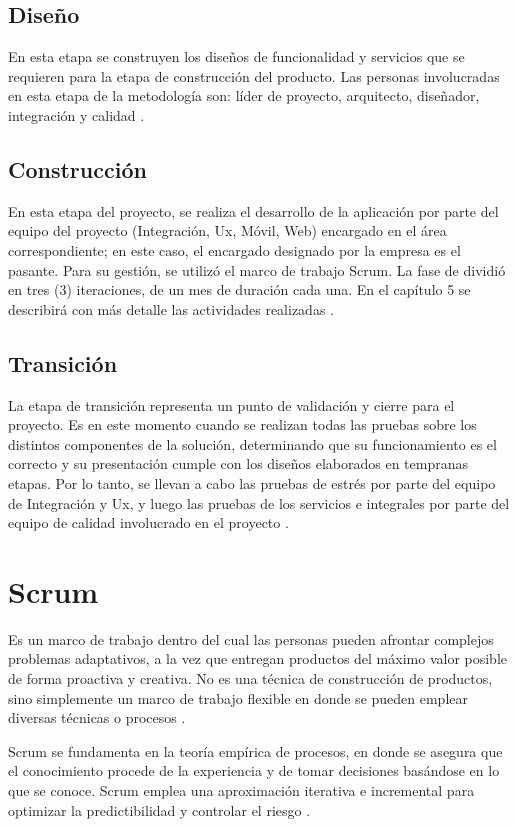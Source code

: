 \subsection{Diseño}
En esta etapa se construyen los diseños de funcionalidad y servicios que se requieren para la etapa de construcción del producto. Las personas involucradas en esta etapa de la metodología son: líder de proyecto, arquitecto, diseñador, integración y calidad \cite{MMSynergy}.

\subsection{Construcción}
En esta etapa del proyecto, se realiza el desarrollo de la aplicación por parte del equipo del proyecto (Integración, Ux, Móvil, Web) encargado en el área correspondiente; en este caso, el encargado designado por la empresa es el pasante. Para su gestión, se utilizó el marco de trabajo Scrum. La fase de dividió en tres (3) iteraciones, de un mes de duración cada una. En el capítulo 5 se describirá con más detalle las actividades realizadas \cite{MMSynergy}.

\subsection{Transición}
La etapa de transición representa un punto de validación y cierre para el proyecto. Es en este momento cuando se realizan todas las pruebas sobre los distintos componentes de la solución, determinando que su funcionamiento es el correcto y su presentación cumple con los diseños elaborados en tempranas etapas. Por lo tanto,  se llevan a cabo las pruebas de estrés por parte del equipo de Integración y Ux, y luego las pruebas de los servicios e integrales por parte del equipo de calidad involucrado en el proyecto \cite{MMSynergy}.

\section{Scrum} \label{sect:Scrum}
Es un marco de trabajo dentro del cual las personas pueden  afrontar complejos problemas adaptativos, a la vez que entregan productos del máximo valor posible de forma proactiva y creativa. No es una técnica de construcción de productos, sino simplemente un marco de trabajo flexible en donde se pueden emplear diversas técnicas o procesos \cite{MMSCRM}. 

Scrum se fundamenta en la teoría empírica de procesos, en donde se asegura que el conocimiento procede de la experiencia y de tomar decisiones basándose en lo que se conoce. Scrum emplea una aproximación iterativa e incremental para optimizar la predictibilidad y controlar el riesgo \cite{MMSCRM}.

